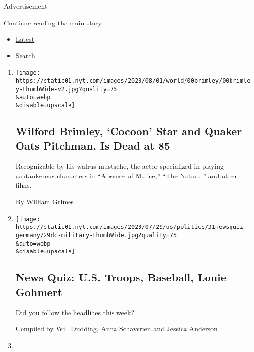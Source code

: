 Advertisement

\protect\hyperlink{after-mid2}{Continue reading the main story}

\begin{itemize}
\tightlist
\item
  \protect\hyperlink{stream-panel}{Latest}
\item
  Search
\end{itemize}

\begin{enumerate}
\def\labelenumi{\arabic{enumi}.}
\item
  \href{/2020/08/01/obituaries/wilford-brimley-dead.html}{}

  \texttt{[image: https://static01.nyt.com/images/2020/08/01/world/00brimley/00brimley-thumbWide-v2.jpg?quality=75\\\&auto=webp\\\&disable=upscale]}

  \hypertarget{wilford-brimley-cocoon-star-and-quaker-oats-pitchman-is-dead-at-85}{%
  \subsection{Wilford Brimley, `Cocoon' Star and Quaker Oats Pitchman,
  Is Dead at
  85}\label{wilford-brimley-cocoon-star-and-quaker-oats-pitchman-is-dead-at-85}}

  Recognizable by his walrus mustache, the actor specialized in playing
  cantankerous characters in ``Absence of Malice,'' ``The Natural'' and
  other films.

  By William Grimes
\item
  \href{/interactive/2020/07/31/briefing/troops-baseball-louie-gohmert-news-quiz.html}{}

  \texttt{[image: https://static01.nyt.com/images/2020/07/29/us/politics/31newsquiz-germany/29dc-military-thumbWide.jpg?quality=75\\\&auto=webp\\\&disable=upscale]}

  \hypertarget{news-quiz-us-troops-baseball-louie-gohmert}{%
  \subsection{News Quiz: U.S. Troops, Baseball, Louie
  Gohmert}\label{news-quiz-us-troops-baseball-louie-gohmert}}

  Did you follow the headlines this week?

  Compiled by Will Dudding, Anna Schaverien and Jessica Anderson
\item
  \href{/2020/07/30/sports/olympics/ben-jipcho-dead.html}{}


\end{enumerate}

